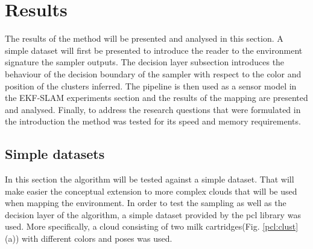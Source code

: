\documentclass[twoside,hidelinks]{article}
\begin{document}
\newpage
\section{Results}
\label{sec:results}

The results of the method will be presented and analysed in this section. A simple dataset will first be presented to introduce the reader to the environment signature the sampler outputs. The decision layer subsection introduces the behaviour of the decision boundary of the sampler with respect to the color and position of the clusters inferred. The pipeline is then used as a sensor model in the EKF-SLAM experiments section and the results of the mapping are presented and analysed. Finally, to address the research questions that were formulated in the introduction the method was tested for its speed and memory requirements.


\subsection{Simple datasets}

In this section the algorithm will be tested against a simple dataset. That will make easier the conceptual extension to more complex clouds that will be used when mapping the environment. In order to test the sampling as well as the decision layer of the algorithm, a simple dataset provided by the pcl\cite{pcl} library was used. More specifically, a cloud consisting of two milk cartridges(Fig. \ref{pcl:clust}(a)) with different colors and poses was used. 
\end{document}
